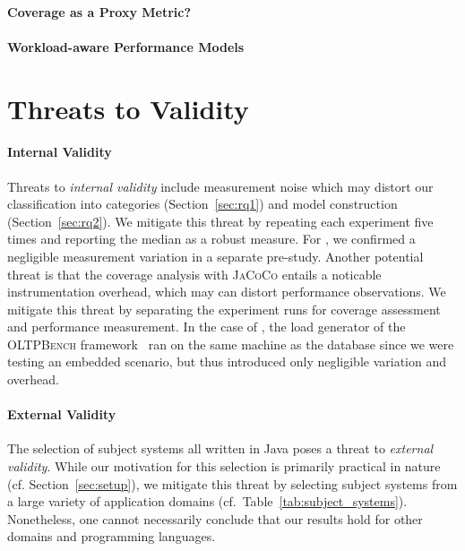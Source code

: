 \paragraph*{Coverage as a Proxy Metric?}
\paragraph*{Workload-aware Performance Models}
\section{Threats to Validity}\label{sec:threats}

\paragraph*{Internal Validity}\label{sec:internal_validity}
Threats to \emph{internal validity} include measurement noise which may distort our classification into categories (Section~\ref{sec:rq1}) and model construction (Section~\ref{sec:rq2}). We mitigate this threat by repeating each experiment five times and reporting the median as a robust measure. For \htwo, we confirmed a negligible measurement variation in a separate pre-study.
Another potential threat is that the coverage analysis with \mbox{\textsc{JaCoCo}} entails a noticable instrumentation overhead, which may can distort performance observations. We mitigate this threat by separating the experiment runs for coverage assessment and performance measurement. In the case of \htwo, the load generator of the \textsc{OLTPBench} framework~\cite{difallah_oltp_2013} ran on the same machine as the database since we were testing an embedded scenario, but thus introduced only negligible variation and overhead.
\paragraph*{External Validity}\label{sec:external_validity}
The selection of subject systems all written in Java poses a threat to \emph{external validity}. While our motivation for this selection is primarily practical in nature (cf. Section~\ref{sec:setup}), we mitigate this threat by selecting subject systems from a large variety of application domains (cf.~Table~\ref{tab:subject_systems}). Nonetheless, one cannot necessarily conclude that our results hold for other domains and programming languages. 
